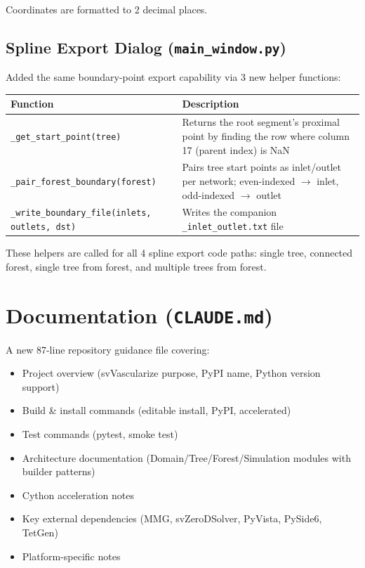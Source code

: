 \documentclass[11pt,a4paper]{article}
\begin{document}
Coordinates are formatted to 2 decimal places.

\subsection{Spline Export Dialog (\texttt{main\_window.py})}

Added the same boundary-point export capability via 3 new helper functions:

\begin{longtable}{p{4.5cm}p{7.5cm}}
\toprule
\textbf{Function} & \textbf{Description} \\
\midrule
\endhead
\texttt{\_get\_start\_point(tree)} & Returns the root segment's proximal point by finding the row where column 17 (parent index) is NaN \\
\texttt{\_pair\_forest\_boundary(forest)} & Pairs tree start points as inlet/outlet per network; even-indexed $\to$ inlet, odd-indexed $\to$ outlet \\
\texttt{\_write\_boundary\_file(inlets, outlets, dst)} & Writes the companion \texttt{\_inlet\_outlet.txt} file \\
\bottomrule
\end{longtable}

These helpers are called for all 4 spline export code paths: single tree, connected forest, single tree from forest, and multiple trees from forest.

\section{Documentation (\texttt{CLAUDE.md})}

A new 87-line repository guidance file covering:
\begin{itemize}[nosep]
    \item Project overview (svVascularize purpose, PyPI name, Python version support)
    \item Build \& install commands (editable install, PyPI, accelerated)
    \item Test commands (pytest, smoke test)
    \item Architecture documentation (Domain/Tree/Forest/Simulation modules with builder patterns)
    \item Cython acceleration notes
    \item Key external dependencies (MMG, svZeroDSolver, PyVista, PySide6, TetGen)
    \item Platform-specific notes
\end{itemize}
\end{document}

